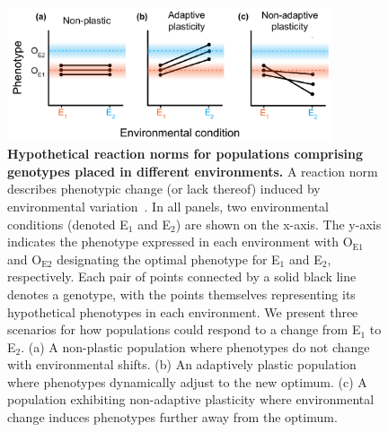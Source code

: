 \begin{raggedbottom}
\begin{figure}[ht!]
\centering
\includegraphics[width=0.85\textwidth]{05_consequences_of_plasticity/media/media-reaction-norms.pdf}
\caption{\small
\textbf{Hypothetical reaction norms for populations comprising genotypes placed in different environments.}
A reaction norm describes phenotypic change (or lack thereof) induced by environmental variation~\citep{west-eberhard_phenotypic_2008}. 
In all panels, two environmental conditions (denoted E$_1$ and E$_2$) are shown on the x-axis.
The y-axis indicates the phenotype expressed in each environment with O$_{\text{E}1}$ and O$_{\text{E}2}$ designating the optimal phenotype for E$_1$ and E$_2$, respectively.
Each pair of points connected by a solid black line denotes a genotype, with the points themselves representing its hypothetical phenotypes in each environment.
We present three scenarios for how populations could respond to a change from E$_1$ to E$_2$.
(a) A non-plastic population where phenotypes do not change with environmental shifts.  
(b) An adaptively plastic population where phenotypes dynamically adjust to the new optimum. 
(c) A population exhibiting non-adaptive plasticity where environmental change induces phenotypes further away from the optimum. 
}
\label{fig:reaction-norms}
\end{figure}


\end{raggedbottom}
